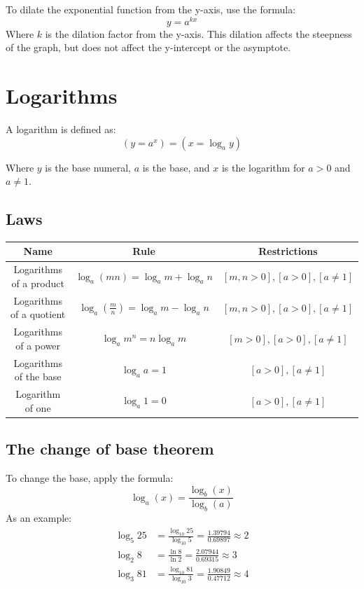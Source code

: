 \documentclass{book}
\begin{document}
To dilate the exponential function from the y-axis, use the formula:
\[
	y = a^{kx}
\]
Where $k$ is the dilation factor from the y-axis.  This dilation affects the steepness of the graph, but does not affect the y-intercept or the asymptote.

\chapter{Logarithms}
A logarithm is defined as:
\[
	(y = a^x) = (x = \log_ay)
\]
\begin{center}
\end{center}
Where $y$ is the base numeral, $a$ is the base, and $x$ is the logarithm for $a > 0$ and $a \not = 1$.

\section{Laws}
\begin{center}
	\begin{tabular}{c|c|c}
		Name                     & Rule                                      & Restrictions                        \\ \hline
		Logarithms of a product  & $\log_a(mn) = \log_am + \log_an$          & $[m, n > 0], [a > 0], [a \not = 1]$ \\
		Logarithms of a quotient & $\log_a(\frac{m}{n}) = \log_am - \log_an$ & $[m, n > 0], [a > 0], [a \not = 1]$ \\
		Logarithms of a power    & $\log_am^n = n\log_am$                    & $[m > 0], [a > 0], [a \not = 1]$    \\
		Logarithms of the base   & $\log_aa = 1$                             & $[a > 0], [a \not = 1]$             \\
		Logarithm of one         & $\log_a 1 = 0$                            & $[a > 0], [a \not = 1]$
	\end{tabular}
\end{center}

\section{The change of base theorem}
To change the base, apply the formula:
\[
	\log_{a}{(x)} = \frac{\log_{b}{(x)}}{\log_{b}{(a)}}
\]
As an example:
\begin{align*}
	\log_{5}25 & = \frac{\log_{10}25}{\log_{10}5} = \frac{1.39794}{0.69897} \approx 2 \\
	\log_{2}8  & = \frac{\ln 8}{\ln 2} = \frac{2.07944}{0.69315} \approx 3            \\
	\log_{3}81 & = \frac{\log_{10}81}{\log_{10}3} = \frac{1.90849}{0.47712} \approx 4
\end{align*}
\end{document}
